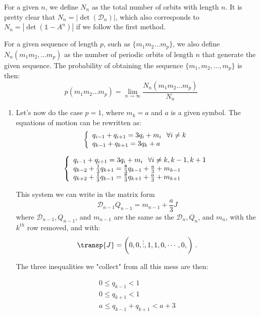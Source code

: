 \begin{description}
{\vskip 0.1in

For a given $n$, we define $N_n$ as the total number of orbits with length $n$.
It is pretty clear that $N_n = |\det(\mathcal{D}_n)|$, which also corresponds to $N_n = |\det(\mathds{1} - A^n)|$ if we follow the first method.

\vskip 0.1in

For a given sequence of length $p$, such as $\{m_1 m_2 \dots m_p\}$, we also
define $N_n(m_1 m_2, \dots m_p)$ as the number of periodic orbits of length $n$ that generate the given sequence. The probability of obtaining the sequence $\{m_1,m_2, \dots, m_p\}$ is then:
\[
p(m_1 m_2 \dots m_p) = \lim_{n\to\infty} \frac{N_n(m_1 m_2 \dots m_p)}{N_n}
\]


\begin{enumerate}
\item
Let's now do the case $p=1$, where $m_k = a$ and $a$ is a given symbol. The equations of motion can be rewritten as:
\[
\left\{
\begin {array} {ll}
q_{i-1} + q_{i+1} = 3q_i + m_i  \hskip 0.1in  \forall i \neq k \\
q_{k-1} + q_{k+1} = 3q_k + a \\
\end {array}
\right.
 \]

\[
\left\{
\begin {array} {lll}
q_{i-1} + q_{i+1} = 3q_i + m_i  \hskip 0.1in  \forall i \neq k, k-1, k+1 \\
q_{k-2} + \frac{1}{3}q_{k+1} = \frac{8}{3}q_{k-1} + \frac{a}{3} + m_{k-1} \\
q_{k+2} + \frac{1}{3}q_{k-1} = \frac{8}{3}q_{k+1} + \frac{a}{3} + m_{k+1} \\
\end {array}
\right.
\]

This system we can write in the matrix form
\[
 \mathcal{D}_{n-1} Q_{n-1} = m_{n-1} + \frac{a}{3} J
 \]
where $\mathcal{D}_{n-1}, Q_{n-1}$, and $m_{n-1}$ are the same as the
$\mathcal{D}_{n}, Q_{n}$, and $m_{n}$, with the $k^{th}$ row removed, and
with:
\[
\transp{J} = \left (
 0 ,
 0 ,
 \vdots ,
 1 ,
 1 ,
 0 ,
 \cdots ,
 0 ,
\right )
\,.
\]

The three inequalities we "collect" from all this mess are then:

\[
\begin {array} {c}
0 \leq q_{k-1} < 1 \\
0 \leq q_{k+1} < 1 \\
a \leq q_{k-1} + q_{k+1} < a + 3 \\
\end {array}
\]


\end{enumerate}}
\end{description}
